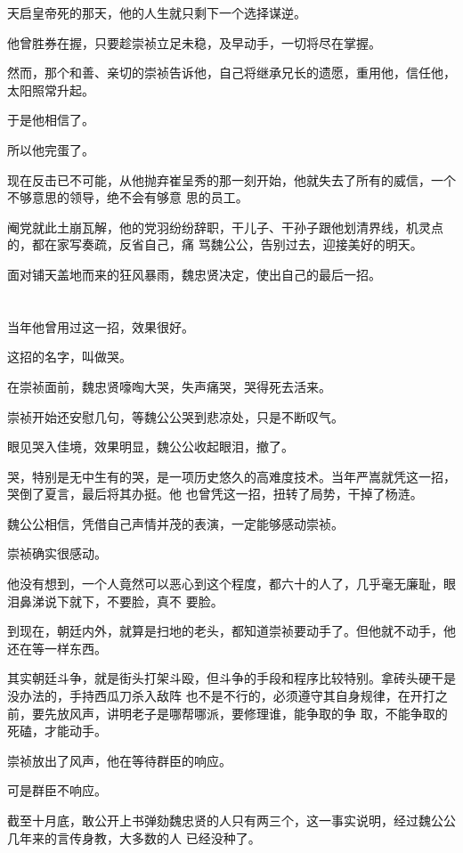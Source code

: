 \documentclass[11pt,a4paper,onecolumn]{article}
\begin{document}
天启皇帝死的那天，他的人生就只剩下一个选择\myrule 谋逆。

他曾胜券在握，只要趁崇祯立足未稳，及早动手，一切将尽在掌握。

然而，那个和善、亲切的崇祯告诉他，自己将继承兄长的遗愿，重用他，信任他，太阳照常升起。

于是他相信了。

所以他完蛋了。

现在反击已不可能，从他抛弃崔呈秀的那一刻开始，他就失去了所有的威信，一个不够意思的领导，绝不会有够意
思的员工。

阉党就此土崩瓦解，他的党羽纷纷辞职，干儿子、干孙子跟他划清界线，机灵点的，都在家写奏疏，反省自己，痛
骂魏公公，告别过去，迎接美好的明天。

面对铺天盖地而来的狂风暴雨，魏忠贤决定，使出自己的最后一招。

\section[\thesection]{}

当年他曾用过这一招，效果很好。

这招的名字，叫做哭。

在崇祯面前，魏忠贤嚎啕大哭，失声痛哭，哭得死去活来。

崇祯开始还安慰几句，等魏公公哭到悲凉处，只是不断叹气。

眼见哭入佳境，效果明显，魏公公收起眼泪，撤了。

哭，特别是无中生有的哭，是一项历史悠久的高难度技术。当年严嵩就凭这一招，哭倒了夏言，最后将其办挺。他
也曾凭这一招，扭转了局势，干掉了杨涟。

魏公公相信，凭借自己声情并茂的表演，一定能够感动崇祯。

崇祯确实很感动。

他没有想到，一个人竟然可以恶心到这个程度，都六十的人了，几乎毫无廉耻，眼泪鼻涕说下就下，不要脸，真不
要脸。

到现在，朝廷内外，就算是扫地的老头，都知道崇祯要动手了。但他就不动手，他还在等一样东西。

其实朝廷斗争，就是街头打架斗殴，但斗争的手段和程序比较特别。拿砖头硬干是没办法的，手持西瓜刀杀入敌阵
也不是不行的，必须遵守其自身规律，在开打之前，要先放风声，讲明老子是哪帮哪派，要修理谁，能争取的争
取，不能争取的死磕，才能动手。

崇祯放出了风声，他在等待群臣的响应。

可是群臣不响应。

截至十月底，敢公开上书弹劾魏忠贤的人只有两三个，这一事实说明，经过魏公公几年来的言传身教，大多数的人
已经没种了。
\end{document}

